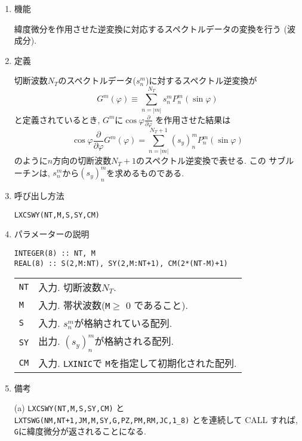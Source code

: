 \documentclass[a4j]{jarticle}
\begin{document}
\begin{enumerate}

\item 機能

  緯度微分を作用させた逆変換に対応するスペクトルデータの変換を行う
  (波成分).
  
\item 定義

切断波数$N_T$のスペクトルデータ($s^m_n$)に対するスペクトル逆変換が
\begin{equation}
G^m(\varphi)\equiv\sum^{N_T}_{n=|m|}s^m_nP^m_n(\sin\varphi)
\end{equation}
と定義されているとき, $G^m$に$\cos\varphi\frac{\partial}{\partial\varphi}$
を作用させた結果は
\begin{equation}
\cos\varphi\frac{\partial}{\partial\varphi}
G^m(\varphi)=\sum^{N_T+1}_{n=|m|}
(s_y)^m_nP^m_n(\sin\varphi)
\end{equation}
のように$n$方向の切断波数$N_T+1$のスペクトル逆変換で表せる. この
サブルーチンは, $s^m_n$から$(s_y)^m_n$を求めるものである.

\item 呼び出し方法 
    
\texttt{LXCSWY(NT,M,S,SY,CM)}
  
\item パラメーターの説明

\begin{verbatim}
INTEGER(8) :: NT, M
REAL(8) :: S(2,M:NT), SY(2,M:NT+1), CM(2*(NT-M)+1)
\end{verbatim}
      
\begin{tabular}{ll}
\texttt{NT} & 入力. 切断波数$N_T$.\\
\texttt{M} & 入力. 帯状波数(\texttt{M}$\ge$ 0 であること).\\
\texttt{S} & 入力. $s^m_n$が格納されている配列.\\
\texttt{SY} & 出力. $(s_y)^m_n$が格納される配列.\\
\texttt{CM}  & 入力. \texttt{LXINIC}で \texttt{M}を指定して初期化された配列.
\end{tabular}

\item 備考

(a) \texttt{LXCSWY(NT,M,S,SY,CM)} と 
    \texttt{LXTSWG(NM,NT+1,JM,M,SY,G,PZ,PM,RM,JC,1\_8)}
    とを連続して CALL すれば, \texttt{G}に緯度微分が返されることになる.
  
\end{enumerate}
\end{document}
